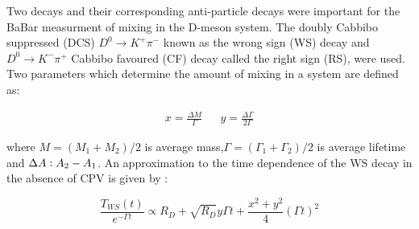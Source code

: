 Two decays and their corresponding anti-particle decays were important for the BaBar measurment of mixing in the D-meson system. The doubly Cabbibo suppressed (DCS) $D^{0} \rightarrow K^{+} \pi^{-}$ known as the wrong sign (WS) decay and $D^{0} \rightarrow K^{-} \pi^{+}$ Cabbibo favoured (CF) decay called the right sign (RS), were used. Two parameters which determine the amount of mixing in a system are defined as:

\begin{align}\label{xyDeonMixing}
x = \frac{\Delta M}{\Gamma} & & y = \frac{\Delta \Gamma}{2 \Gamma}
\end{align}

\noindent where $M= (M_{1}+M_{2})/2$ is average mass,$\Gamma = (\Gamma_{1}+\Gamma_{2})/2$ is average lifetime and $\Delta A \vcentcolon A_{2} - A_{1}$. An approximation to the time dependence of the WS decay in the absence of CPV is given by \cite{BabarD0mixing}:

\begin{equation*}
\frac{T_{WS}(t)}{e^{-\Gamma t}} \propto R_{D} + \sqrt{R_{D}} y \Gamma t + \frac{x^2 + y^2}{4} (\Gamma t)^{2}
\end{equation*}

